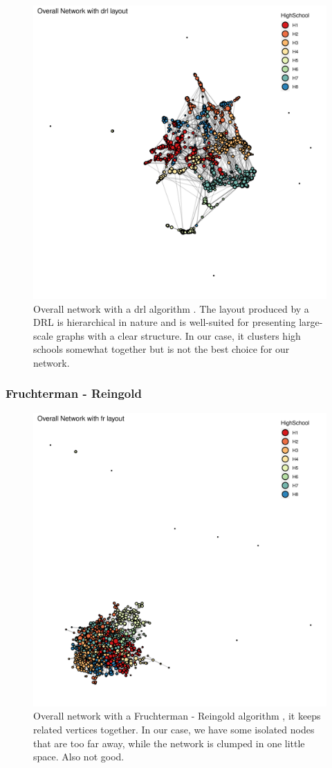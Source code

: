     \begin{figure}[h!]
        \centering
            \includegraphics[width=0.7\linewidth]{figures/Networks/Layouts/Graph_OverallNetwork_with_no_highlight_drl_HighSchool___drl.png} 
        \caption{Overall network with a \gls{drl} algorithm  \cite{osti_1145621} . The layout produced by a DRL is hierarchical in nature and is well-suited for presenting large-scale graphs with a clear structure. In our case, it clusters high schools somewhat together but is not the best choice for our network.}
        \label{figure:networksLayoutsDRL}
    \end{figure}

    \newpage

\subsubsection{Fruchterman - Reingold}

    \begin{figure}[h!]
        \centering
            \includegraphics[width=0.7\linewidth]{figures/Networks/Layouts/Graph_OverallNetwork_with_no_highlight_fr_HighSchool___fr.png} 
        \caption{Overall network with a Fruchterman - Reingold algorithm \cite{Fruchterman1991}, it keeps related vertices together. In our case, we have some isolated nodes that are too far away, while the network is clumped in one little space. Also not good.}
        \label{figure:networksLayoutsFR}
    \end{figure}

